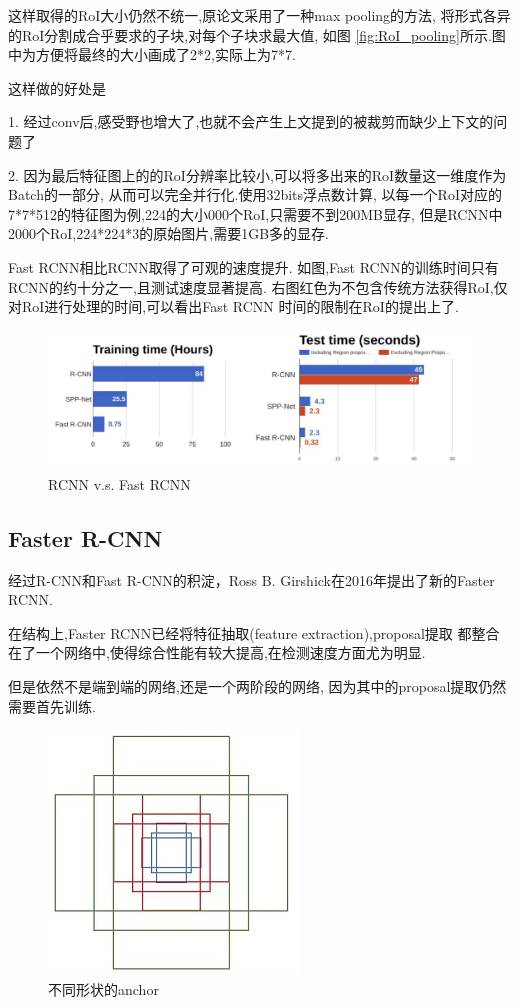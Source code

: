 这样取得的RoI大小仍然不统一,原论文采用了一种max pooling的方法,
将形式各异的RoI分割成合乎要求的子块,对每个子块求最大值,
如图 \ref{fig:RoI_pooling}所示.图中为方便将最终的大小画成了2*2,实际上为7*7.

这样做的好处是

1. 经过conv后,感受野也增大了,也就不会产生上文提到的被裁剪而缺少上下文的问题了

2. 因为最后特征图上的的RoI分辨率比较小,可以将多出来的RoI数量这一维度作为Batch的一部分,
从而可以完全并行化.使用32bits浮点数计算,
以每一个RoI对应的7*7*512的特征图为例,224的大小000个RoI,只需要不到200MB显存,
但是RCNN中2000个RoI,224*224*3的原始图片,需要1GB多的显存.

Fast RCNN相比RCNN取得了可观的速度提升.
如图,Fast RCNN的训练时间只有RCNN的约十分之一,且测试速度显著提高.
右图红色为不包含传统方法获得RoI,仅对RoI进行处理的时间,可以看出Fast RCNN
时间的限制在RoI的提出上了.

\begin{figure}[htbp]
    \centering
    \includegraphics[scale=0.65]{figures/rcnn_vs_frcnn.png}
    \caption{RCNN v.s. Fast RCNN}
\end{figure}

\subsection{Faster R-CNN}

经过R-CNN和Fast R-CNN的积淀，Ross B. Girshick在2016年提出了新的Faster RCNN.

在结构上,Faster RCNN已经将特征抽取(feature extraction),proposal提取
都整合在了一个网络中,使得综合性能有较大提高,在检测速度方面尤为明显.

但是依然不是端到端的网络,还是一个两阶段的网络, 因为其中的proposal提取仍然需要首先训练.

\begin{figure}[htbp]
    \centering
    \includegraphics[scale=0.7]{figures/anchor.jpg}
    \caption{不同形状的anchor}
    \label{fig:anchor}
\end{figure}


